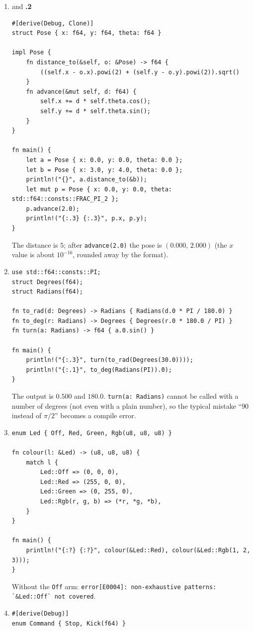 \begin{enumerate}[label=\textbf{\ansnum.\arabic*}]
  \item and \textbf{\ansnum.2}
\begin{verbatim}
#[derive(Debug, Clone)]
struct Pose { x: f64, y: f64, theta: f64 }

impl Pose {
    fn distance_to(&self, o: &Pose) -> f64 {
        ((self.x - o.x).powi(2) + (self.y - o.y).powi(2)).sqrt()
    }
    fn advance(&mut self, d: f64) {
        self.x += d * self.theta.cos();
        self.y += d * self.theta.sin();
    }
}

fn main() {
    let a = Pose { x: 0.0, y: 0.0, theta: 0.0 };
    let b = Pose { x: 3.0, y: 4.0, theta: 0.0 };
    println!("{}", a.distance_to(&b));
    let mut p = Pose { x: 0.0, y: 0.0, theta: std::f64::consts::FRAC_PI_2 };
    p.advance(2.0);
    println!("{:.3} {:.3}", p.x, p.y);
}
\end{verbatim}
The distance is $5$; after \verb!advance(2.0)! the pose is $(0.000,\,2.000)$ (the $x$ value is about $10^{-16}$, rounded away by the format).
  \item[\textbf{\ansnum.3}]
\begin{verbatim}
use std::f64::consts::PI;
struct Degrees(f64);
struct Radians(f64);

fn to_rad(d: Degrees) -> Radians { Radians(d.0 * PI / 180.0) }
fn to_deg(r: Radians) -> Degrees { Degrees(r.0 * 180.0 / PI) }
fn turn(a: Radians) -> f64 { a.0.sin() }

fn main() {
    println!("{:.3}", turn(to_rad(Degrees(30.0))));
    println!("{:.1}", to_deg(Radians(PI)).0);
}
\end{verbatim}
The output is $0.500$ and $180.0$. \verb!turn(a: Radians)! cannot be called with a number of degrees (not even with a plain number), so the typical mistake ``$90$ instead of $\pi/2$'' becomes a compile error.
  \item[\textbf{\ansnum.4}]
\begin{verbatim}
enum Led { Off, Red, Green, Rgb(u8, u8, u8) }

fn colour(l: &Led) -> (u8, u8, u8) {
    match l {
        Led::Off => (0, 0, 0),
        Led::Red => (255, 0, 0),
        Led::Green => (0, 255, 0),
        Led::Rgb(r, g, b) => (*r, *g, *b),
    }
}

fn main() {
    println!("{:?} {:?}", colour(&Led::Red), colour(&Led::Rgb(1, 2, 3)));
}
\end{verbatim}
Without the \verb!Off! arm: \verb!error[E0004]: non-exhaustive patterns: `&Led::Off` not covered!.
  \item[\textbf{\ansnum.5}]
\begin{verbatim}
#[derive(Debug)]
enum Command { Stop, Kick(f64) }


\end{verbatim}
\end{enumerate}
